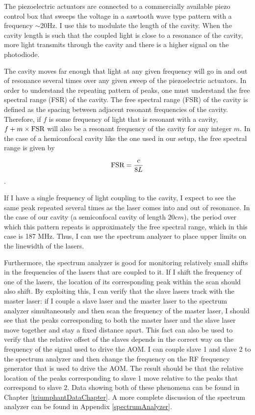 The piezoelectric actuators are connected to a commercially available piezo control box that sweeps the voltage in a sawtooth wave type pattern with a frequency $\sim$20Hz. I use this to modulate the length of the cavity. When the cavity length is such that the coupled light is close to a resonance of the cavity, more light transmits through the cavity and there is a higher signal on the photodiode. 

The cavity moves far enough that light at any given frequency will go in and out of resonance several times over any given sweep of the piezoelectric actuators. In order to understand the repeating pattern of peaks, one must understand the free spectral range (FSR) of the cavity. The free spectral range (FSR) of the cavity is defined as the spacing between adjacent resonant frequencies of the cavity. Therefore, if $f$ is some frequency of light that is resonant with a cavity, $f+m\times \textnormal{FSR}$ will also be a resonant frequency of the cavity for any integer $m$. In the case of a hemiconfocal cavity like the one used in our setup, the free spectral range is given by 

\begin{equation}
    \textnormal{FSR}=\frac{c}{8L}
\end{equation}.

If I have a single frequency of light coupling to the cavity, I expect to see the same peak repeated several times as the laser comes into and out of resonance. In the case of our cavity (a semiconfocal cavity of length $20cm$), the period over which this pattern repeats is approximately the free spectral range, which in this case is 187 MHz. Thus, I can use the spectrum analyzer to place upper limits on the linewidth of the lasers. 

Furthermore, the spectrum analyzer is good for monitoring relatively small shifts in the frequencies of the lasers that are coupled to it. If I shift the frequency of one of the lasers, the location of its corresponding peak within the scan should also shift. 
By exploiting this, I can verify that the slave lasers track with the master laser: if I couple a slave laser and the master laser to the spectrum analyzer simultaneously and then scan the frequency of the master laser, I should see that the peaks corresponding to both the master laser and the slave laser move together and stay a fixed distance apart. 
This fact can also be used to verify that the relative offset of the slaves depends in the correct way on the frequency of the signal used to drive the AOM. I can couple slave 1 and slave 2 to the spectrum analyzer and then change the frequency on the RF frequency generator that is used to drive the AOM. The result should be that the relative location of the peaks corresponding to slave 1 move relative to the peaks that correspond to slave 2. Data showing both of these phenomena can be found in Chapter \ref{triumphantDataChapter}. A more complete discussion of the spectrum analyzer can be found in Appendix \ref{spectrumAnalyzer}. 
